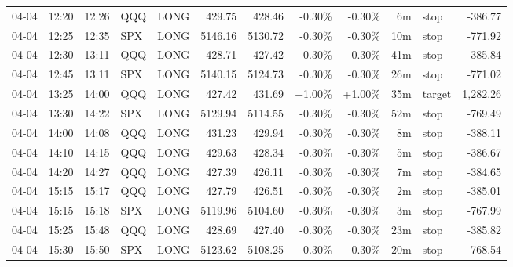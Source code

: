 \documentclass[11pt,a4paper]{article}
\begin{document}
\begin{center}
\begin{longtable}{>{\color{txtmain}}l l l l l r r r r r >{\color{txtmain}}l r}
04-04 & 12:20 & 12:26 & QQQ & LONG & 429.75 & 428.46 & \textcolor{lossred}{-0.30\%} & \textcolor{lossred}{-0.30\%} & 6m & stop & \textcolor{lossred}{-386.77} \\
04-04 & 12:25 & 12:35 & SPX & LONG & 5146.16 & 5130.72 & \textcolor{lossred}{-0.30\%} & \textcolor{lossred}{-0.30\%} & 10m & stop & \textcolor{lossred}{-771.92} \\
04-04 & 12:30 & 13:11 & QQQ & LONG & 428.71 & 427.42 & \textcolor{lossred}{-0.30\%} & \textcolor{lossred}{-0.30\%} & 41m & stop & \textcolor{lossred}{-385.84} \\
04-04 & 12:45 & 13:11 & SPX & LONG & 5140.15 & 5124.73 & \textcolor{lossred}{-0.30\%} & \textcolor{lossred}{-0.30\%} & 26m & stop & \textcolor{lossred}{-771.02} \\
04-04 & 13:25 & 14:00 & QQQ & LONG & 427.42 & 431.69 & \textcolor{wingreen}{+1.00\%} & \textcolor{wingreen}{+1.00\%} & 35m & target & \textcolor{wingreen}{1,282.26} \\
04-04 & 13:30 & 14:22 & SPX & LONG & 5129.94 & 5114.55 & \textcolor{lossred}{-0.30\%} & \textcolor{lossred}{-0.30\%} & 52m & stop & \textcolor{lossred}{-769.49} \\
04-04 & 14:00 & 14:08 & QQQ & LONG & 431.23 & 429.94 & \textcolor{lossred}{-0.30\%} & \textcolor{lossred}{-0.30\%} & 8m & stop & \textcolor{lossred}{-388.11} \\
04-04 & 14:10 & 14:15 & QQQ & LONG & 429.63 & 428.34 & \textcolor{lossred}{-0.30\%} & \textcolor{lossred}{-0.30\%} & 5m & stop & \textcolor{lossred}{-386.67} \\
04-04 & 14:20 & 14:27 & QQQ & LONG & 427.39 & 426.11 & \textcolor{lossred}{-0.30\%} & \textcolor{lossred}{-0.30\%} & 7m & stop & \textcolor{lossred}{-384.65} \\
04-04 & 15:15 & 15:17 & QQQ & LONG & 427.79 & 426.51 & \textcolor{lossred}{-0.30\%} & \textcolor{lossred}{-0.30\%} & 2m & stop & \textcolor{lossred}{-385.01} \\
04-04 & 15:15 & 15:18 & SPX & LONG & 5119.96 & 5104.60 & \textcolor{lossred}{-0.30\%} & \textcolor{lossred}{-0.30\%} & 3m & stop & \textcolor{lossred}{-767.99} \\
04-04 & 15:25 & 15:48 & QQQ & LONG & 428.69 & 427.40 & \textcolor{lossred}{-0.30\%} & \textcolor{lossred}{-0.30\%} & 23m & stop & \textcolor{lossred}{-385.82} \\
04-04 & 15:30 & 15:50 & SPX & LONG & 5123.62 & 5108.25 & \textcolor{lossred}{-0.30\%} & \textcolor{lossred}{-0.30\%} & 20m & stop & \textcolor{lossred}{-768.54} \\

\end{longtable}
\end{center}
\end{document}

